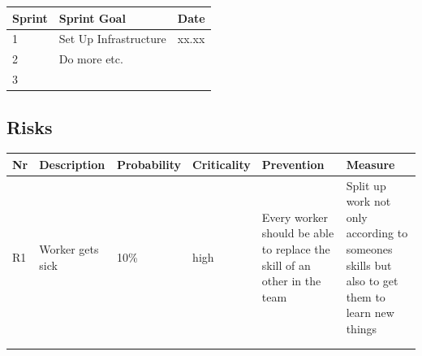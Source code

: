 \documentclass{article}
\begin{document}
\begin{table}[htb!]
\begin{tabular}{lll}
\textbf{Sprint} & \textbf{Sprint Goal} & \textbf{Date} \\
\hline
1      & Set Up Infrastructure & xx.xx \\
2      & Do more etc.          &            \\
3       &                       &           
\end{tabular}
\end{table}

\subsection{Risks}

\begin{tabularx}{\textwidth}{llllXX}
\textbf{Nr} & \textbf{Description} & \textbf{Probability} & \textbf{Criticality} & \textbf{Prevention}                                                      & \textbf{Measure}                                                                             \\
\hline
R1          & Worker gets sick     & 10\%                 & high                 & Every worker should be able to replace the skill of an other in the team & Split up work not only according to someones skills but also to get them to learn new things \\
            &                      &                      &                      &                                                                          &                                                                                              \\
            &                      &                      &                      &                                                                          &                                                                                             
\end{tabularx}
\end{document}
